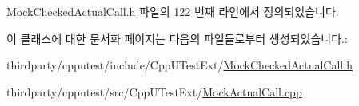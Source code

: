 Mock\+Checked\+Actual\+Call.\+h 파일의 122 번째 라인에서 정의되었습니다.



이 클래스에 대한 문서화 페이지는 다음의 파일들로부터 생성되었습니다.\+:\begin{DoxyCompactItemize}
\item 
thirdparty/cpputest/include/\+Cpp\+U\+Test\+Ext/\hyperlink{_mock_checked_actual_call_8h}{Mock\+Checked\+Actual\+Call.\+h}\item 
thirdparty/cpputest/src/\+Cpp\+U\+Test\+Ext/\hyperlink{_mock_actual_call_8cpp}{Mock\+Actual\+Call.\+cpp}\end{DoxyCompactItemize}
